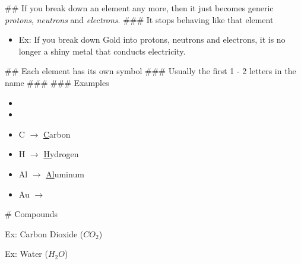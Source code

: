 \documentclass[../../Main/main.tex]{subfiles}
\begin{document}
\begin{easylist}
	## If you break down an element any more, then it just becomes generic \emph{protons}, \emph{neutrons} and \emph{electrons}.
	### It stops behaving like that element
	\begin{itemize}
		\item Ex: If you break down Gold into protons, neutrons and electrons, it is no longer a shiny metal that conducts electricity.
	\end{itemize}
	## Each element has its own symbol
	### Usually the first 1 - 2 letters in the name
	### 
	### Examples
	\begin{itemize}
		\item {}
		\item {}
		\item C $\rightarrow$ \underline{C}arbon
		\item H $\rightarrow$ \underline{H}ydrogen
		\item Al $\rightarrow$ \underline{Al}uminum
		\item Au $\rightarrow$ 
	\end{itemize}


	# Compounds



	\begin{multicols}{2}
		Ex: Carbon Dioxide ($CO_2$)\\


		\columnbreak

		Ex: Water ($H_{2}O$)\\

	\end{multicols}



\end{easylist}
\end{document}
